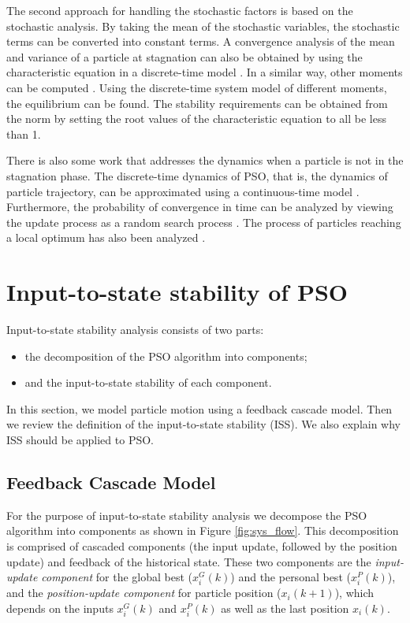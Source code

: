 \documentclass{sig-alternate}
\begin{document}
The second approach for handling the stochastic factors is based on the stochastic analysis.
By taking the mean of the stochastic variables, the stochastic terms can be converted into
constant terms.
A convergence analysis of the mean and variance of a particle at stagnation can also be obtained by using the characteristic equation in a discrete-time model 
\cite{Jiang20078}.
In a similar way, 
other moments can be computed
\cite{5175367,Poli:2007:EAS:1276958.1276977,Poli:2008:DSS:1384929.1384944}.
Using the discrete-time system model of different moments, the equilibrium can be found.
The stability requirements can be obtained from the norm by setting the root values of the characteristic equation to all be less than 1.

There is also some work that addresses the dynamics when a particle is not in the stagnation phase.
The discrete-time dynamics of PSO, that is, the dynamics of particle trajectory, can be approximated
using a continuous-time model
\cite{5675669}.
Furthermore, the probability of convergence in time can be analyzed
by viewing the update process as a random search process
\cite{vandenBergh:2010:CPP:2010420.2010421}.
The process of particles reaching a local optimum
has also been analyzed
\cite{Schmitt:2013:PSO:2463372.2463563}.

\section{Input-to-state stability of PSO}
\label{sec:sys_model}

Input-to-state stability analysis consists of two parts:
\begin{itemize}
\item the decomposition of the PSO algorithm into components;
\item and the input-to-state stability of each component.
\end{itemize}
In this section, we model particle motion using a feedback cascade model.
Then we review the definition of the input-to-state stability (ISS).
We also explain why ISS should be applied to PSO.

\subsection{Feedback Cascade Model}
\label{sec:feedback_cascade_model}

For the purpose of input-to-state stability analysis we decompose the PSO algorithm into components as shown in Figure \ref{fig:sys_flow}. This decomposition is comprised of cascaded components (the input update, followed by the position update) and feedback of the historical state.
These two components are the 
\emph{input-update component} for the global best ($ x^{G}_{i}(k) $) and the personal best ($ x^{P}_{i}(k) $), and the 
\emph{position-update component} for particle position ($ x_{i}(k+1) $), which depends on the inputs $ x^{G}_{i}(k) $ and $ x^{P}_{i}(k) $ as well as the last position $ x_{i}(k) $.
\end{document}
